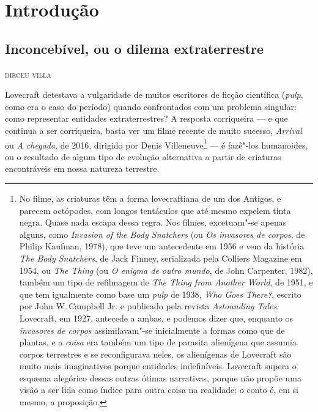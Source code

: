 \baselineskip

\part{Introdução}

\chapter*{Inconcebível, ou o dilema extraterrestre}

\begin{flushright}
\textsc{dirceu villa}
\end{flushright}


\noindent{}Lovecraft detestava a vulgaridade de muitos escritores de ficção
científica (\textit{pulp}, como era o caso do período) quando confrontados
com um problema singular: como representar entidades extraterrestres? A
resposta corriqueira --- e que continua a ser corriqueira, basta ver um
filme recente de muito sucesso, \textit{Arrival} ou \textit{A chegada}, de 2016,
dirigido por Denis Villeneuve\footnote{No filme, as criaturas têm a forma lovecraftiana de um dos Antigos, e parecem octópodes, com longos tentáculos que até mesmo expelem tinta negra. Quase nada escapa dessa regra. Nos filmes, excetuam"-se apenas alguns, como \textit{Invasion of the Body Snatchers} (ou \textit{Os invasores de corpos}, de Philip Kaufman, 1978), que teve um antecedente em 1956 e vem da história \textit{The Body Snatchers}, de Jack Finney, serializada pela Colliers Magazine em 1954, ou \textit{The Thing} (ou \textit{O enigma de outro mundo}, de John Carpenter, 1982), também um tipo de refilmagem de \textit{The Thing from Another World}, de 1951, e que tem igualmente como base um \textit{pulp} de 1938, \textit{Who Goes There?}, escrito por John W.\,Campbell Jr. e publicado pela revista \textit{Astounding Tales}. Lovecraft, em 1927, antecede a ambas, e podemos dizer que, enquanto os \textit{invasores de corpos} assimilavam"-se inicialmente a formas como que de plantas, e a \textit{coisa} era também um tipo de parasita alienígena que assumia corpos terrestres e se reconfigurava neles, os alienígenas de Lovecraft são muito mais imaginativos porque entidades indefiníveis. Lovecraft supera o esquema alegórico dessas outras ótimas narrativas, porque não propõe uma visão a ser lida como índice para outra coisa na realidade: o conto é, em si mesmo, a proposição.} --- é fazê"-los
humanoides, ou o resultado de algum tipo de evolução alternativa a
partir de criaturas encontráveis em nossa natureza terrestre.

